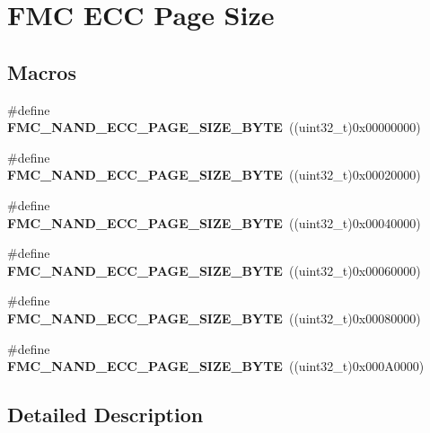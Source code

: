 \hypertarget{group___f_m_c___e_c_c___page___size}{}\section{F\+MC E\+CC Page Size}
\label{group___f_m_c___e_c_c___page___size}
\subsection*{Macros}
\begin{DoxyCompactItemize}
\item 
\#define {\bfseries F\+M\+C\+\_\+\+N\+A\+N\+D\+\_\+\+E\+C\+C\+\_\+\+P\+A\+G\+E\+\_\+\+S\+I\+Z\+E\+\_\+B\+Y\+TE}~((uint32\+\_\+t)0x00000000)\hypertarget{group___f_m_c___e_c_c___page___size_ga0f375c640fad597b2dfdda35e1c61e82}{}\label{group___f_m_c___e_c_c___page___size_ga0f375c640fad597b2dfdda35e1c61e82}

\item 
\#define {\bfseries F\+M\+C\+\_\+\+N\+A\+N\+D\+\_\+\+E\+C\+C\+\_\+\+P\+A\+G\+E\+\_\+\+S\+I\+Z\+E\+\_\+B\+Y\+TE}~((uint32\+\_\+t)0x00020000)\hypertarget{group___f_m_c___e_c_c___page___size_gadd336e72d48c0d3c2f16d1e1a1c8e490}{}\label{group___f_m_c___e_c_c___page___size_gadd336e72d48c0d3c2f16d1e1a1c8e490}

\item 
\#define {\bfseries F\+M\+C\+\_\+\+N\+A\+N\+D\+\_\+\+E\+C\+C\+\_\+\+P\+A\+G\+E\+\_\+\+S\+I\+Z\+E\+\_\+B\+Y\+TE}~((uint32\+\_\+t)0x00040000)\hypertarget{group___f_m_c___e_c_c___page___size_ga8863e3415ae19dda54daa82f9ce1ed22}{}\label{group___f_m_c___e_c_c___page___size_ga8863e3415ae19dda54daa82f9ce1ed22}

\item 
\#define {\bfseries F\+M\+C\+\_\+\+N\+A\+N\+D\+\_\+\+E\+C\+C\+\_\+\+P\+A\+G\+E\+\_\+\+S\+I\+Z\+E\+\_\+B\+Y\+TE}~((uint32\+\_\+t)0x00060000)\hypertarget{group___f_m_c___e_c_c___page___size_ga2875548ae2b5cd2f7545307561d550d9}{}\label{group___f_m_c___e_c_c___page___size_ga2875548ae2b5cd2f7545307561d550d9}

\item 
\#define {\bfseries F\+M\+C\+\_\+\+N\+A\+N\+D\+\_\+\+E\+C\+C\+\_\+\+P\+A\+G\+E\+\_\+\+S\+I\+Z\+E\+\_\+B\+Y\+TE}~((uint32\+\_\+t)0x00080000)\hypertarget{group___f_m_c___e_c_c___page___size_gaa2e34fa611baf547461b930e6fae9c8a}{}\label{group___f_m_c___e_c_c___page___size_gaa2e34fa611baf547461b930e6fae9c8a}

\item 
\#define {\bfseries F\+M\+C\+\_\+\+N\+A\+N\+D\+\_\+\+E\+C\+C\+\_\+\+P\+A\+G\+E\+\_\+\+S\+I\+Z\+E\+\_\+B\+Y\+TE}~((uint32\+\_\+t)0x000\+A0000)\hypertarget{group___f_m_c___e_c_c___page___size_ga8f7f54eaa946e9e35001cb2566def05a}{}\label{group___f_m_c___e_c_c___page___size_ga8f7f54eaa946e9e35001cb2566def05a}

\end{DoxyCompactItemize}


\subsection{Detailed Description}
